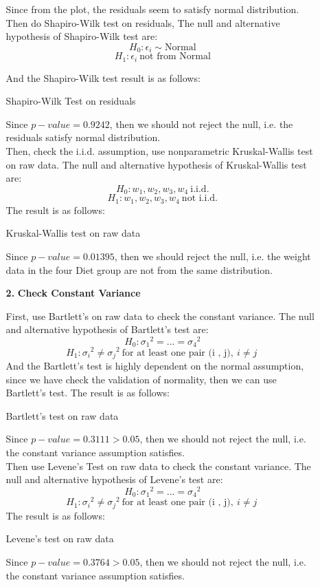 \documentclass[10pt,letterpaper]{article}
\begin{document}
\begin{enumerate}[leftmargin=0cm,itemindent=.5cm,labelwidth=\itemindent,labelsep=0cm,align=left]
\begin{enumerate}[leftmargin=0cm,itemindent=.5cm,labelwidth=\itemindent,labelsep=0cm,align=left]
\begin{center}
\end{center}
Since from the plot, the residuals seem to satisfy normal distribution. Then do Shapiro-Wilk test on residuals, 
The null and alternative hypothesis of Shapiro-Wilk test are:
\[H_0: \epsilon_i \sim \text{Normal}\]
\[H_1: \epsilon_i \ \text{not from Normal}\]

And the Shapiro-Wilk test result is as follows:
\begin{center}
Shapiro-Wilk Test on residuals

\end{center}

Since $p-value = 0.9242$, then we should not reject the null, i.e. the residuals satisfy normal distribution.\\

Then, check the i.i.d. assumption, use nonparametric Kruskal-Wallis test on raw data. The null and alternative hypothesis of Kruskal-Wallis test are:
\[H_0: w_1, w_2, w_3, w_4 \ \text{i.i.d.} \]
\[H_1: w_1, w_2, w_3, w_4\  \text{not i.i.d.} \]
The result is as follows:
\begin{center}
Kruskal-Wallis test on raw data

\end{center}
Since $p-value=0.01395 $, then we should reject the null, i.e. the weight data in the four Diet group are not from the same distribution. 

\item[\textbf{2.}] \textbf{Check Constant Variance}

First, use Bartlett's on raw data to check the constant variance. The null and alternative hypothesis of  Bartlett's test are:
\[H_0:  {\sigma_1}^2 = ... = {\sigma_4}^2\]
\[H_1:  {\sigma_i}^2 \neq {\sigma_j}^2  \ \text{for at least one pair (i , j)},\  i \neq j\ \]
And the Bartlett's test is highly dependent on the normal assumption, since we have check the validation of normality, then we can use Bartlett's test. The result is as follows:
\begin{center}
Bartlett's test on raw data

\end{center}
Since $p-value=0.3111>0.05$, then we should not reject the null, i.e. the constant variance assumption satisfies.\\

Then use Levene's Test on raw data to check the constant variance. The null and alternative hypothesis of Levene's test are:
\[H_0:  {\sigma_1}^2 = ... = {\sigma_4}^2\]
\[H_1:  {\sigma_i}^2 \neq {\sigma_j}^2  \ \text{for at least one pair (i , j)},\  i \neq j\ \]
The result is as follows:
\begin{center}
Levene's test on raw data

\end{center}
Since $p-value=0.3764>0.05$, then we should not reject the null, i.e. the constant variance assumption satisfies.


\end{enumerate}
\end{enumerate}
\end{document}

